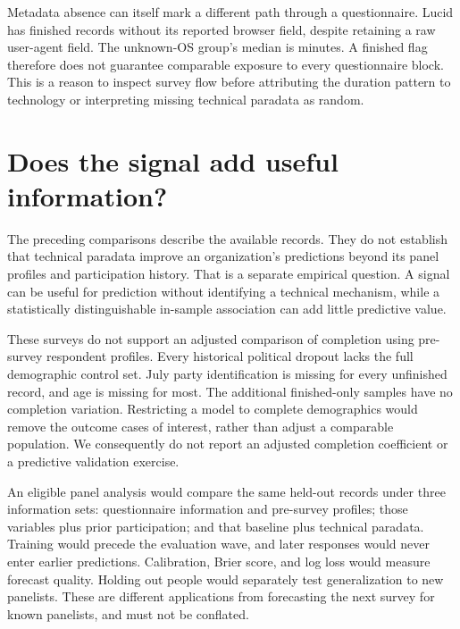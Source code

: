 \documentclass[11pt]{article}
\begin{document}
Metadata absence can itself mark a different path through a questionnaire. Lucid has \LucidMetadataMissing{} finished records without its reported browser field, despite retaining a raw user-agent field. The unknown-OS group's median is \LucidUnknownMinutes{} minutes. A finished flag therefore does not guarantee comparable exposure to every questionnaire block. This is a reason to inspect survey flow before attributing the duration pattern to technology or interpreting missing technical paradata as random.

\section{Does the signal add useful information?}

The preceding comparisons describe the available records. They do not establish that technical paradata improve an organization's predictions beyond its panel profiles and participation history. That is a separate empirical question. A signal can be useful for prediction without identifying a technical mechanism, while a statistically distinguishable in-sample association can add little predictive value.

These surveys do not support an adjusted comparison of completion using pre-survey respondent profiles. Every historical political dropout lacks the full demographic control set. July party identification is missing for every unfinished record, and age is missing for most. The additional finished-only samples have no completion variation. Restricting a model to complete demographics would remove the outcome cases of interest, rather than adjust a comparable population. We consequently do not report an adjusted completion coefficient or a predictive validation exercise.

An eligible panel analysis would compare the same held-out records under three information sets: questionnaire information and pre-survey profiles; those variables plus prior participation; and that baseline plus technical paradata. Training would precede the evaluation wave, and later responses would never enter earlier predictions. Calibration, Brier score, and log loss would measure forecast quality. Holding out people would separately test generalization to new panelists. These are different applications from forecasting the next survey for known panelists, and must not be conflated.
\end{document}
